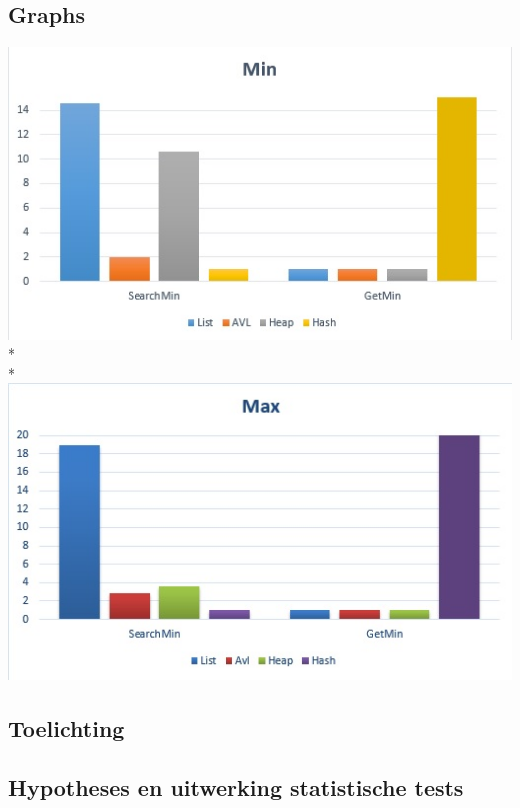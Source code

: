 \documentclass{article}
\begin{document}
\subsection{Graphs}
\includegraphics{MinGrafiek}\\*\\*
\includegraphics{MaxGrafiek}
\subsection{Toelichting}
\subsection{Hypotheses en uitwerking statistische tests}
\end{document}
